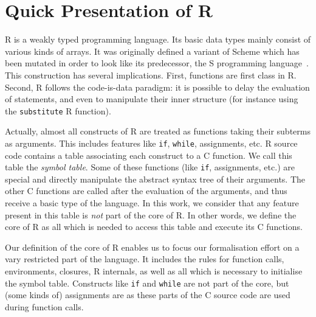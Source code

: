 \documentclass[9pt, sigplan, natbib=false, screen=true]{acmart}
\newcommand\R{R}
\newcommand\Cn{C}
\begin{document}
\section{Quick Presentation of \R{}}
\label{sec:presentation}

\R{} is a weakly typed programming language.
Its basic data types mainly consist of various kinds of arrays.
It was originally defined a variant of Scheme
which has been mutated in order to look like its predecessor,
the S programming language~\parencite{ihaka1996r}.
This construction has several implications.
First, functions are first class in \R{}.
Second, \R{} follows the code-is-data paradigm:
it is possible to delay the evaluation of statements,
and even to manipulate their inner structure
(for instance using the \texttt{substitute} \R{} function).

Actually, almost all constructs of \R{} are treated
as functions taking their subterms as arguments.
This includes features like \texttt{if}, \texttt{while},
assignments, etc.
\R{} source code contains a table associating each construct
to a \Cn{} function.
We call this table the \emph{symbol table}.
Some of these functions (like \texttt{if}, assignments, etc.)
are special and directly manipulate the abstract syntax tree
of their arguments.
The other \Cn{} functions are called after the evaluation of the arguments,
and thus receive a basic type of the language.
%
In this work,
we consider that any feature present in this table
is \emph{not} part of the core of \R{}.
In other words, we define the core of \R{}
as all which is needed to access this table
and execute its \Cn{} functions.

Our definition of the core of \R{} enables us to focus
our formalisation effort on a vary restricted part of the language.
It includes the rules for function calls,
environments, closures, \R{} internals,
as well as all which is necessary to initialise the symbol table.
Constructs like \texttt{if} and \texttt{while}
are not part of the core,
but (some kinds of) assignments are
as these parts of the \Cn{} source code
are used during function calls.
\end{document}
